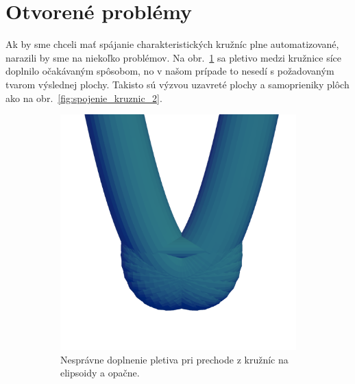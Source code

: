 \section{Otvorené problémy}
Ak by sme chceli mať spájanie charakteristických kružníc plne automatizované, 
narazili by sme na niekoľko problémov. Na obr.~\ref{fig:spojenie_kruznic_1} sa pletivo medzi kružnice síce doplnilo očakávaným spôsobom, no v našom prípade to nesedí s požadovaným tvarom výslednej plochy.
Takisto sú výzvou uzavreté plochy a samoprieniky plôch ako na obr.~\ref{fig:spojenie_kruznic_2}.
\begin{figure}[h]
    \centering
    \begin{subfigure}[b]{0.49\textwidth}
        \centering
        \includegraphics[width=\textwidth]{images/interpolacia.png}
		\caption{Nesprávne doplnenie pletiva pri prechode z kružníc na elipsoidy a opačne.}
        \label{fig:spojenie_kruznic_1}
    \end{subfigure}
    \hfill
    \begin{subfigure}[b]{0.49\textwidth}
        \centering

\end{subfigure}
\end{figure}
